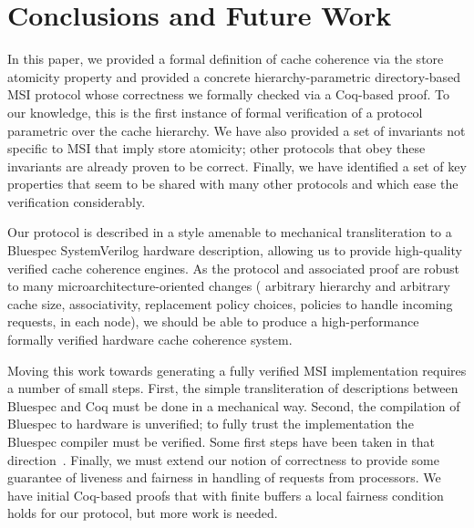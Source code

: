 \section{Conclusions and Future Work}

In this paper, we provided a formal definition of cache coherence via the store
atomicity property and provided a concrete hierarchy-parametric directory-based
MSI protocol whose correctness we formally checked via a Coq-based proof. To our
knowledge, this is the first instance of formal verification of a protocol parametric
over the cache hierarchy. We have also provided a set of invariants not
specific to MSI that imply store atomicity; other protocols that obey these
invariants are already proven to be correct. Finally, we have identified a set
of key properties that seem to be shared with many other protocols and which ease
the verification considerably.

Our protocol is described in a style amenable to mechanical transliteration to a
Bluespec SystemVerilog hardware description, allowing us to provide high-quality
verified cache coherence engines. As the protocol and associated proof are robust
to many microarchitecture-oriented changes (\eg{} arbitrary hierarchy and
arbitrary cache size, associativity, replacement policy choices, policies to
handle incoming requests, \etc{} in each node), we should be able to produce a
high-performance formally verified hardware cache coherence system.

Moving this work towards generating a fully verified MSI implementation
requires a number of small steps. First, the simple transliteration of
descriptions between Bluespec and Coq must be done in a mechanical way.
Second, the compilation of Bluespec to hardware is unverified; to fully trust
the implementation the Bluespec compiler must be verified. Some first steps
have been taken in that direction~\cite{TDBLP:conf/cav/BraibantC13}. Finally, we must
extend our notion of correctness to provide some guarantee of
liveness and fairness in handling of requests from processors. We have
initial Coq-based proofs that with finite buffers a local fairness condition
holds for our protocol, but more work is needed. 


